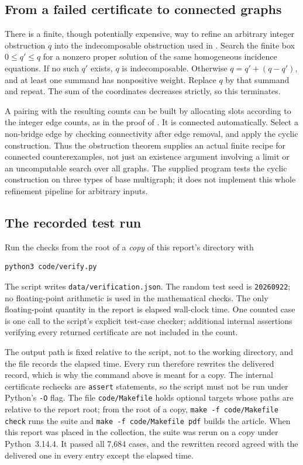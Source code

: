 \documentclass[11pt,letterpaper]{article}
\numberwithin{equation}{section}
\theoremstyle{definition}
\theoremstyle{remark}
\begin{document}
\subsection{From a failed certificate to connected graphs}

There is a finite, though potentially expensive, way to refine an arbitrary
integer obstruction $q$ into the indecomposable obstruction used in
. Search the finite box $0\le q'\le q$ for a nonzero
proper solution of the same homogeneous incidence equations. If no such
$q'$ exists, $q$ is indecomposable. Otherwise
$q=q'+(q-q')$, and at least one summand has nonpositive weight. Replace $q$
by that summand and repeat. The sum of the coordinates decreases strictly,
so this terminates.

A pairing with the resulting counts can be built by allocating slots
according to the integer edge counts, as in the proof of
. It is connected automatically. Select a non-bridge
edge by checking connectivity after edge removal, and apply the cyclic
construction. Thus the obstruction theorem supplies an actual finite recipe
for connected counterexamples, not just an existence argument involving a
limit or an uncomputable search over all graphs. The supplied program tests
the cyclic construction on three types of base multigraph; it does not
implement this whole refinement pipeline for arbitrary inputs.

\subsection{The recorded test run}
\label{wick:sub:testrun}

Run the checks from the root of a \emph{copy} of this report's directory with
\begin{lstlisting}
python3 code/verify.py
\end{lstlisting}
The script writes \texttt{data/verification.json}. The random test seed is
\texttt{20260922}; no floating-point arithmetic is used in the mathematical
checks. The only floating-point quantity in the report is elapsed wall-clock
time. One counted case is one call to the script's explicit test-case
checker; additional internal assertions verifying every returned
certificate are not included in the count.

The output path is fixed relative to the script, not to the working
directory, and the file records the elapsed time. Every run therefore
rewrites the delivered record, which is why the command above is meant for a
copy. The internal certificate rechecks are \texttt{assert} statements, so
the script must not be run under Python's \texttt{-O} flag. The file
\texttt{code/Makefile} holds optional targets whose paths are relative to the
report root; from the root of a copy, \texttt{make -f code/Makefile check}
runs the suite and \texttt{make -f code/Makefile pdf} builds the article.
When this report was placed in the collection, the suite was rerun on a copy
under Python~3.14.4. It passed all 7,684 cases, and the rewritten record
agreed with the delivered one in every entry except the elapsed time.
\end{document}
